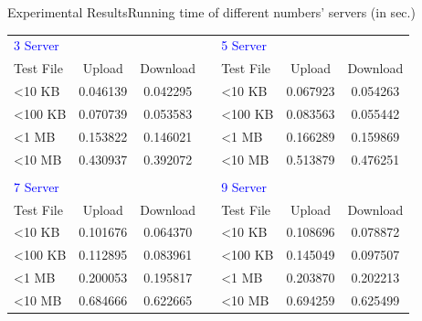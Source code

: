 \documentclass{beamer}
\begin{document}
\begin{CJK}{UTF8}{bkai}
\begin{frame}{Experimental Results}{Running time of different numbers' servers (in sec.)}
    \begin{table}[]
    \small
    \centering
    \label{my-label}
    \begin{tabular}{lccllcc}
        \textcolor{blue}{3 Server} & \multicolumn{1}{l}{} & \multicolumn{1}{l}{} &  & \textcolor{blue}{5 Server} & \multicolumn{1}{l}{} & \multicolumn{1}{l}{} \\
        Test File                  & Upload               & Download             &  & Test File                  & Upload               & Download             \\
        \textless 10 KB            & 0.046139             & 0.042295             &  & \textless 10 KB            & 0.067923             & 0.054263             \\
        \textless 100 KB           & 0.070739             & 0.053583             &  & \textless 100 KB           & 0.083563             & 0.055442             \\
        \textless 1 MB             & 0.153822             & 0.146021             &  & \textless 1 MB             & 0.166289             & 0.159869             \\
        \textless 10 MB            & 0.430937             & 0.392072             &  & \textless 10 MB            & 0.513879             & 0.476251             \\
                                   &                      &                      &  &                            &                      &                      \\
        \textcolor{blue}{7 Server} & \multicolumn{1}{l}{} & \multicolumn{1}{l}{} &  & \textcolor{blue}{9 Server} & \multicolumn{1}{l}{} & \multicolumn{1}{l}{} \\
        Test File                  & Upload               & Download             &  & Test File                  & Upload               & Download             \\
        \textless 10 KB            & 0.101676             & 0.064370             &  & \textless 10 KB            & 0.108696             & 0.078872             \\
        \textless 100 KB           & 0.112895             & 0.083961             &  & \textless 100 KB           & 0.145049             & 0.097507             \\
        \textless 1 MB             & 0.200053             & 0.195817             &  & \textless 1 MB             & 0.203870             & 0.202213             \\
        \textless 10 MB            & 0.684666             & 0.622665             &  & \textless 10 MB            & 0.694259             & 0.625499            
    \end{tabular}
    \end{table}
\end{frame}


\end{CJK}
\end{document}
